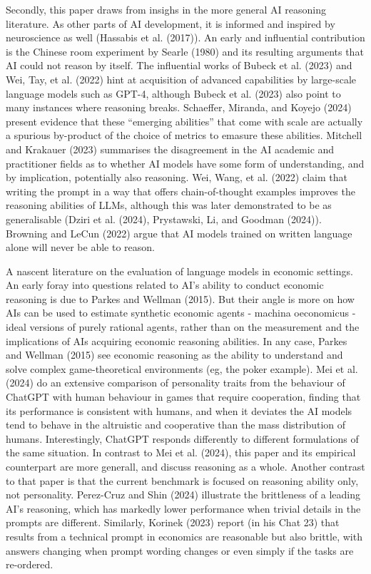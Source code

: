 \documentclass[
]{article}
\begin{document}
Secondly, this paper draws from insighs in the more general AI reasoning
literature. As other parts of AI development, it is informed and
inspired by neuroscience as well (Hassabis et al. (2017)). An early and
influential contribution is the Chinese room experiment by Searle (1980)
and its resulting arguments that AI could not reason by itself. The
influential works of Bubeck et al. (2023) and Wei, Tay, et al. (2022)
hint at acquisition of advanced capabilities by large-scale language
models such as GPT-4, although Bubeck et al. (2023) also point to many
instances where reasoning breaks. Schaeffer, Miranda, and Koyejo (2024)
present evidence that these ``emerging abilities'' that come with scale
are actually a spurious by-product of the choice of metrics to emasure
these abilities. Mitchell and Krakauer (2023) summarises the
disagreement in the AI academic and practitioner fields as to whether AI
models have some form of understanding, and by implication, potentially
also reasoning. Wei, Wang, et al. (2022) claim that writing the prompt
in a way that offers chain-of-thought examples improves the reasoning
abilities of LLMs, although this was later demonstrated to be as
generalisable (Dziri et al. (2024), Prystawski, Li, and Goodman (2024)).
Browning and LeCun (2022) argue that AI models trained on written
language alone will never be able to reason.

A nascent literature on the evaluation of language models in economic
settings. An early foray into questions related to AI's ability to
conduct economic reasoning is due to Parkes and Wellman (2015). But
their angle is more on how AIs can be used to estimate synthetic
economic agents - machina oeconomicus - ideal versions of purely
rational agents, rather than on the measurement and the implications of
AIs acquiring economic reasoning abilities. In any case, Parkes and
Wellman (2015) see economic reasoning as the ability to understand and
solve complex game-theoretical environments (eg, the poker example). Mei
et al. (2024) do an extensive comparison of personality traits from the
behaviour of ChatGPT with human behaviour in games that require
cooperation, finding that its performance is consistent with humans, and
when it deviates the AI models tend to behave in the altruistic and
cooperative than the mass distribution of humans. Interestingly, ChatGPT
responds differently to different formulations of the same situation. In
contrast to Mei et al. (2024), this paper and its empirical counterpart
are more generall, and discuss reasoning as a whole. Another contrast to
that paper is that the current benchmark is focused on reasoning ability
only, not personality. Perez-Cruz and Shin (2024) illustrate the
brittleness of a leading AI's reasoning, which has markedly lower
performance when trivial details in the prompts are different.
Similarly, Korinek (2023) report (in his Chat 23) that results from a
technical prompt in economics are reasonable but also brittle, with
answers changing when prompt wording changes or even simply if the tasks
are re-ordered.
\end{document}
